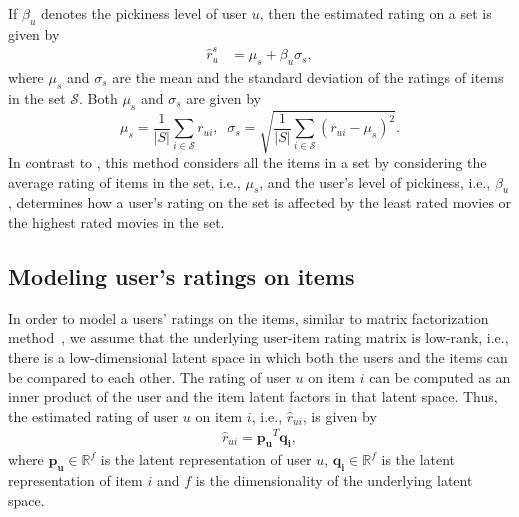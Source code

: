 If $\beta_u$ denotes the pickiness level of user $u$,
then the estimated rating on a set is given by
\begin{equation} \label{varActEq}
  \begin{split}
    \hat{r}_{u}^s &= \mu_{s} + \beta_u \sigma_{s},
  \end{split}
\end{equation}
\noindent where $\mu_{s}$ and $\sigma_{s}$ are the mean and the standard
deviation of the ratings of items in the set $\mathcal{S}$.  %
Both $\mu_{s}$ and $\sigma_{s}$ are given by 
\begin{equation}
  \mu_{s} = \frac{1}{|S|} \sum_{i \in \mathcal{S}} r_{ui},\;\;  
  \sigma_{s} = \sqrt{\frac{1}{|S|} \sum_{i \in \mathcal{S}} (r_{ui} -\mu_{s})^2}.
\end{equation}
\noindent In contrast to \ES, this method considers all the items in a set by considering the average rating of items in the set, i.e., $\mu_{s}$,  and the user's level of pickiness, i.e., $\beta_u$, determines how a user's rating on the set is affected by the least rated movies or the highest rated movies in the set. 

\iffalse
\noindent since we do not know the original ratings of the items in the sets, we
can estimate rating on the set as
\begin{equation} \label{varEstEq}
  \begin{split}
    \hat{r}_{u}^s &= \hat{\mu}_{s} + \beta_u \hat{\sigma}_{s} ,
  \end{split}
\end{equation}
\noindent where $\hat{\mu}_{s}$ is the mean and $\hat{\sigma}_{s}$ is the standard
deviation of the estimated ratings of items in the set $s$.
\fi


\subsection{Modeling user's ratings on items}
In order to model a users' ratings on the items, similar to matrix
factorization method~\cite{koren2009matrix},
we assume that the underlying user-item rating matrix is low-rank, i.e., there is a low-dimensional latent space in which both the users
and the items can be compared to each other. 
The rating of user $u$ on item $i$ can be computed as an inner product of
the user and the item latent factors in that latent space.
Thus, the estimated
rating of user $u$ on item $i$, i.e., $\hat{r}_{ui}$, is given by
\begin{equation} \label{ratPred_eq}
  \begin{split}
    \hat{r}_{ui} = \bm{p_u}^T\bm{q_i},
  \end{split}
\end{equation}
\noindent where $\bm{p_u} \in \mathbb{R}^f$  is the latent representation of user $u$,
$\bm{q_i} \in \mathbb{R}^f$ is the latent representation of item $i$ and $f$ is the
dimensionality of the underlying latent space.


